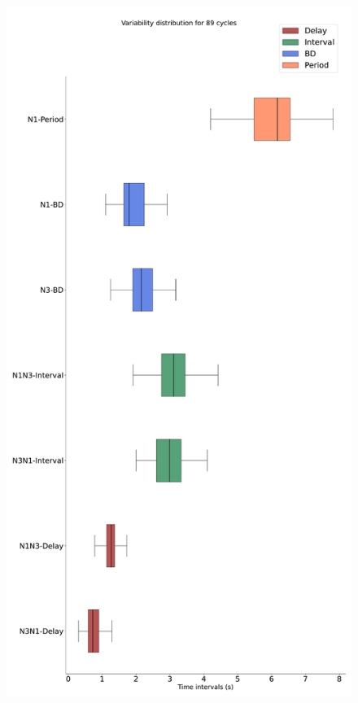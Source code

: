 \begin{figure}[htbp]
\begin{minipage}[b]{0.45\textwidth}
		\includegraphics[width=\textwidth]{./invariants/data/SUSSEX/prep4_so_driven_2/images/spontaneous_boxplot.pdf}
	\end{minipage}
	\begin{minipage}[b]{0.53\textwidth}

\end{minipage}
\end{figure}
